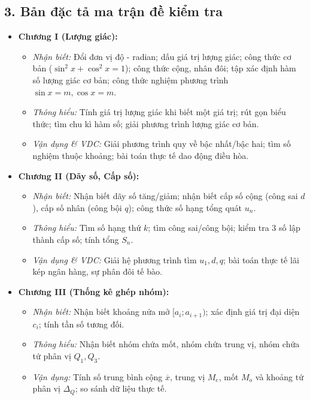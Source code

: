 \documentclass[12pt, a4paper]{article}
\begin{document}
\subsection*{3. Bản đặc tả ma trận đề kiểm tra}
\begin{itemize}[leftmargin=1.5em]
    \item \textbf{Chương I (Lượng giác):}
    \begin{itemize}
        \item \textit{Nhận biết:} Đổi đơn vị độ - radian; dấu giá trị lượng giác; công thức cơ bản ($\sin^2 x + \cos^2 x = 1$); công thức cộng, nhân đôi; tập xác định hàm số lượng giác cơ bản; công thức nghiệm phương trình $\sin x = m, \cos x = m$.
        \item \textit{Thông hiểu:} Tính giá trị lượng giác khi biết một giá trị; rút gọn biểu thức; tìm chu kì hàm số; giải phương trình lượng giác cơ bản.
        \item \textit{Vận dụng \& VDC:} Giải phương trình quy về bậc nhất/bậc hai; tìm số nghiệm thuộc khoảng; bài toán thực tế dao động điều hòa.
    \end{itemize}
    \item \textbf{Chương II (Dãy số, Cấp số):}
    \begin{itemize}
        \item \textit{Nhận biết:} Nhận biết dãy số tăng/giảm; nhận biết cấp số cộng (công sai $d$), cấp số nhân (công bội $q$); công thức số hạng tổng quát $u_n$.
        \item \textit{Thông hiểu:} Tìm số hạng thứ $k$; tìm công sai/công bội; kiểm tra 3 số lập thành cấp số; tính tổng $S_n$.
        \item \textit{Vận dụng \& VDC:} Giải hệ phương trình tìm $u_1, d, q$; bài toán thực tế lãi kép ngân hàng, sự phân đôi tế bào.
    \end{itemize}
    \item \textbf{Chương III (Thống kê ghép nhóm):}
    \begin{itemize}
        \item \textit{Nhận biết:} Nhận biết khoảng nửa mở $[a_i; a_{i+1})$; xác định giá trị đại diện $c_i$; tính tần số tương đối.
        \item \textit{Thông hiểu:} Nhận biết nhóm chứa mốt, nhóm chứa trung vị, nhóm chứa tứ phân vị $Q_1, Q_3$.
        \item \textit{Vận dụng:} Tính số trung bình cộng $\overline{x}$, trung vị $M_e$, mốt $M_o$ và khoảng tứ phân vị $\Delta_Q$; so sánh dữ liệu thực tế.
    \end{itemize}
\end{itemize}
\end{document}
